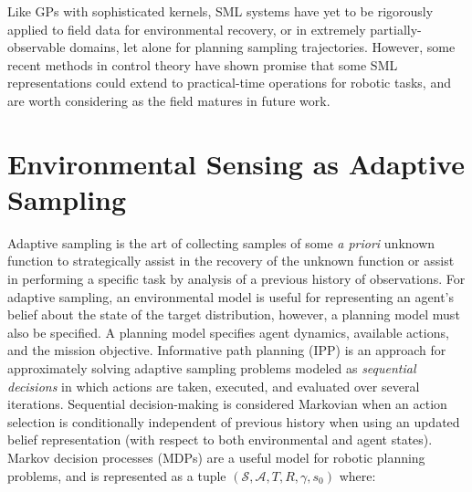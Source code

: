 Like GPs with sophisticated kernels, SML systems have yet to be rigorously applied to field data for environmental recovery, or in extremely partially-observable domains, let alone for planning sampling trajectories. However, some recent methods in control theory\autocite{chee2022knode,jiahaoonline,gan2020data} have shown promise that some SML representations could extend to practical-time operations for robotic tasks, and are worth considering as the field matures in future work.




\section{Environmental Sensing as Adaptive Sampling}
\label{sec:ipp}
Adaptive sampling is the art of collecting samples of some \emph{a priori} unknown function to strategically assist in the recovery of the unknown function or assist in performing a specific task by analysis of a previous history of observations. For adaptive sampling, an environmental model is useful for representing an agent's belief about the state of the target distribution, however, a planning model must also be specified. A planning model specifies agent dynamics, available actions, and the mission objective. Informative path planning (IPP) is an approach for approximately solving adaptive sampling problems modeled as \emph{sequential decisions} in which actions are taken, executed, and evaluated over several iterations. Sequential decision-making is considered Markovian when an action selection is conditionally independent of previous history when using an updated belief representation (with respect to both environmental and agent states). Markov decision processes\autocite{howard1960dynamic,bellman1957markovian} (MDPs) are a useful model for robotic planning problems, and is represented as a tuple $(\mathcal{S}, \mathcal{A}, T, R, \gamma, s_0)$ where:

